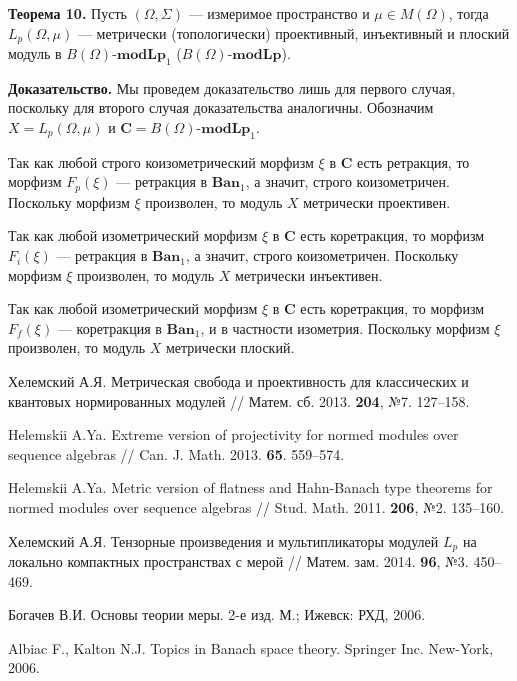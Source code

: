 \documentclass[11pt,twoside]{article}
\begin{document}
\textbf{Теорема 10.}
Пусть $(\Omega,\Sigma)$ --- измеримое пространство и $\mu\in M(\Omega)$, тогда
$L_p(\Omega,\mu)$ --- метрически (топологически)
проективный, инъективный и плоский модуль в $B(\Omega)$-$\mathbf{modLp}_1$
($B(\Omega)$-$\mathbf{modLp}$).

\textbf{Доказательство.} Мы проведем доказательство лишь для первого
случая, поскольку для второго случая доказательства аналогичны.
Обозначим $X=L_p(\Omega,\mu)$ и
$\mathbf{C}=B(\Omega)$-$\mathbf{modLp}_1$.

Так как любой строго коизометрический морфизм $\xi$ в $\mathbf{C}$ есть
ретракция, то морфизм $F_p(\xi)$ --- ретракция в $\mathbf{Ban}_1$, а
значит, строго коизометричен. Поскольку морфизм $\xi$ произволен, то
модуль $X$ метрически проективен.

Так как любой изометрический морфизм $\xi$ в $\mathbf{C}$ есть
коретракция, то морфизм $F_i(\xi)$ --- ретракция в $\mathbf{Ban}_1$, а
значит, строго коизометричен. Поскольку морфизм $\xi$ произволен, то
модуль $X$ метрически инъективен.

Так как любой изометрический морфизм $\xi$ в $\mathbf{C}$ есть
коретракция, то морфизм $F_f(\xi)$ --- коретракция в $\mathbf{Ban}_1$, и
в частности изометрия. Поскольку морфизм $\xi$ произволен, то модуль $X$
метрически плоский.


\newpage


\textbf{\spisoklit}
{\small{}

    {Хелемский А.Я.} Метрическая свобода и проективность для классических и
    квантовых нормированных модулей // Матем. сб. 2013. \textbf{204}, №7.
    127--158.

    {Helemskii A.Ya.} Extreme version of projectivity for normed modules over
    sequence algebras // Can. J. Math. 2013. \textbf{65}. 559--574.

    {Helemskii A.Ya.} Metric version of flatness and Hahn-Banach type theorems
    for normed modules over sequence algebras // Stud. Math. 2011. \textbf{206},
    №2. 135--160.

    {Хелемский А.Я.} Тензорные произведения и мультипликаторы модулей $L_p$ на
    локально компактных пространствах с мерой // Матем. зам. 2014. \textbf{96},
    №3. 450–469.


    {Богачев В.И.} Основы теории меры. 2-е изд. М.; Ижевск: РХД, 2006.

    {Albiac F., Kalton N.J.} Topics in Banach space theory. Springer Inc.
    New-York, 2006.


}
\lend
\end{document}
